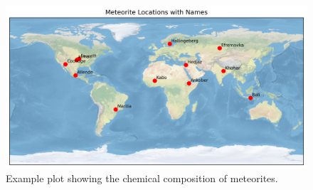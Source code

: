 
\begin{figure}[htbp]
    \centering
    \includegraphics[width=1.0\textwidth]{figures/locations.png}
    \caption{Example plot showing the chemical composition of meteorites.}
    \label{fig:locations}
\end{figure}

